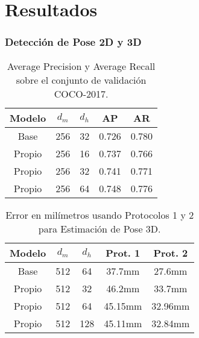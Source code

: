 \documentclass{beamer}
\begin{document}
\section{Resultados}

\begin{frame}
\frametitle{Detección de Pose 2D y 3D}

\tiny

\begin{table}
    \begin{center}
    \begin{tabular}{| c | c | c | c | c |}
        \hline
        \textbf{Modelo} & \textbf{$d_m$} & \textbf{$d_h$} & \textbf{AP} & \textbf{AR} \\
        \hline
        \hline
        Base & 256 & 32 & 0.726 & 0.780 \\
        \hline
        \hline
        Propio & 256 & 16 & 0.737 & 0.766 \\
        \hline
        Propio & 256 & 32 & 0.741 & 0.771 \\
        \hline
        Propio & 256 & 64 & 0.748 & 0.776 \\
        \hline
    \end{tabular}
    \end{center}
\caption{Average Precision y Average Recall sobre el conjunto de validación COCO-2017.}
\label{table:2d}
\end{table}

\begin{table}
    \begin{center}
    \begin{tabular}{| c | c | c | c | c |}
        \hline
        \textbf{Modelo} & \textbf{$d_m$} & \textbf{$d_h$} & \textbf{Prot. 1} & \textbf{Prot. 2} \\
        \hline
        \hline
        Base & 512 & 64 & 37.7mm & 27.6mm \\
        \hline
        \hline
        Propio & 512 & 32 & 46.2mm & 33.7mm \\
        \hline
        Propio & 512 & 64 & 45.15mm & 32.96mm \\
        \hline
        Propio & 512 & 128 & 45.11mm & 32.84mm \\
        \hline
    \end{tabular}
    \end{center}
\caption{Error en milímetros usando Protocolos 1 y 2 para Estimación de Pose 3D.}
\label{table:3d}
\end{table}

\end{frame}
\end{document}
